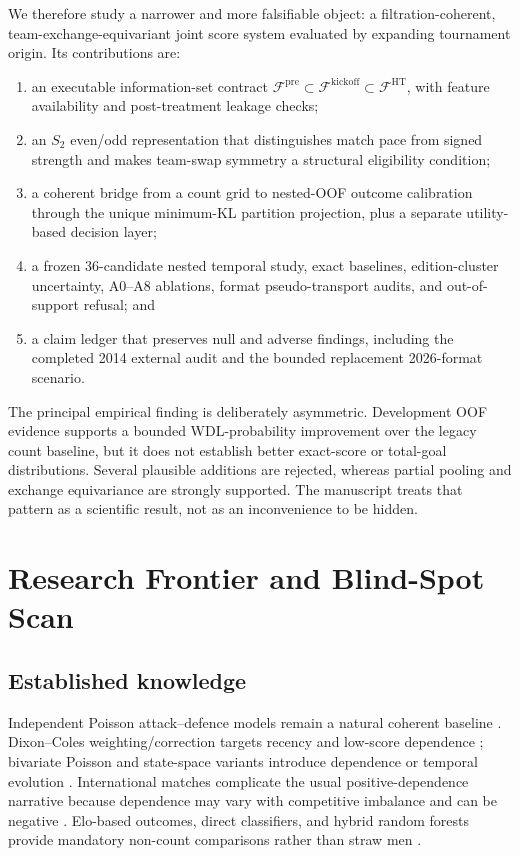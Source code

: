 \documentclass[11pt]{article}
\newcommand{\Fpre}{\mathcal F^{\mathrm{pre}}}
\newcommand{\Fkick}{\mathcal F^{\mathrm{kickoff}}}
\newcommand{\Fht}{\mathcal F^{\mathrm{HT}}}
\begin{document}
We therefore study a narrower and more falsifiable object: a filtration-coherent,
team-exchange-equivariant joint score system evaluated by expanding tournament origin.  Its
contributions are:

\begin{enumerate}
  \item an executable information-set contract
  $\Fpre\subset\Fkick\subset\Fht$, with feature availability and post-treatment leakage checks;
  \item an $S_2$ even/odd representation that distinguishes match pace from signed strength and
  makes team-swap symmetry a structural eligibility condition;
  \item a coherent bridge from a count grid to nested-OOF outcome calibration through the unique
  minimum-KL partition projection, plus a separate utility-based decision layer;
  \item a frozen 36-candidate nested temporal study, exact baselines, edition-cluster uncertainty,
  A0--A8 ablations, format pseudo-transport audits, and out-of-support refusal; and
  \item a claim ledger that preserves null and adverse findings, including the completed 2014
  external audit and the bounded replacement 2026-format scenario.
\end{enumerate}

The principal empirical finding is deliberately asymmetric.  Development OOF evidence supports a
bounded WDL-probability improvement over the legacy count baseline, but it does not establish
better exact-score or total-goal distributions.  Several plausible additions are rejected, whereas
partial pooling and exchange equivariance are strongly supported.  The manuscript treats that
pattern as a scientific result, not as an inconvenience to be hidden.

\section{Research Frontier and Blind-Spot Scan}

\subsection{Established knowledge}

Independent Poisson attack--defence models remain a natural coherent baseline
\citep{maher1982}.  Dixon--Coles weighting/correction targets recency and low-score dependence
\citep{dixoncoles1997}; bivariate Poisson and state-space variants introduce dependence or temporal
evolution \citep{karlisntzoufras2003,koopmanlit2015}.  International matches complicate the usual
positive-dependence narrative because dependence may vary with competitive imbalance and can be
negative \citep{mchalescarf2011}.  Elo-based outcomes, direct classifiers, and hybrid random
forests provide mandatory non-count comparisons rather than straw men
\citep{hvattumarntzen2010,tsokos2019,berrar2019,groll2019}.
\end{document}
